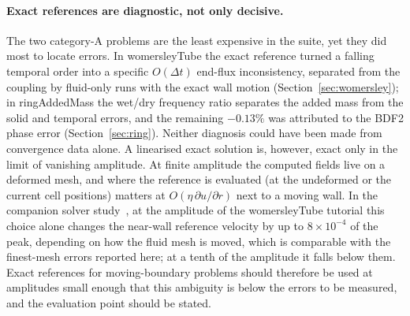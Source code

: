 \paragraph{Exact references are diagnostic, not only decisive.}
The two category-A problems are the least expensive in the suite, yet they did most to locate errors.
In womersleyTube the exact reference turned a falling temporal order into a specific $O(\Delta t)$ end-flux inconsistency, separated from the coupling by fluid-only runs with the exact wall motion (Section~\ref{sec:womersley}); in ringAddedMass the wet/dry frequency ratio separates the added mass from the solid and temporal errors, and the remaining $-0.13\%$ was attributed to the BDF2 phase error (Section~\ref{sec:ring}).
Neither diagnosis could have been made from convergence data alone.
A linearised exact solution is, however, exact only in the limit of vanishing amplitude.
At finite amplitude the computed fields live on a deformed mesh, and where the reference is evaluated (at the undeformed or the current cell positions) matters at $O(\eta\,\partial u/\partial r)$ next to a moving wall.
In the companion solver study~\citep{CardiffBatistic2026QM}, at the amplitude of the womersleyTube tutorial this choice alone changes the near-wall reference velocity by up to $8\times10^{-4}$ of the peak, depending on how the fluid mesh is moved, which is comparable with the finest-mesh errors reported here; at a tenth of the amplitude it falls below them.
Exact references for moving-boundary problems should therefore be used at amplitudes small enough that this ambiguity is below the errors to be measured, and the evaluation point should be stated.

